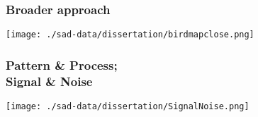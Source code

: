 \documentclass[14pt]{beamer}
\begin{document}
\begin{frame}[t]
\frametitle{Broader approach}
\vspace{-7pt}
\begin{center}
\texttt{[image: ./sad-data/dissertation/birdmapclose.png]}
\end{center}
\end{frame}


\begin{frame}
\frametitle{Pattern \& Process;\\ Signal \& Noise}
\begin{center}
\texttt{[image: ./sad-data/dissertation/SignalNoise.png]}
\end{center}
\end{frame}

\end{document}
